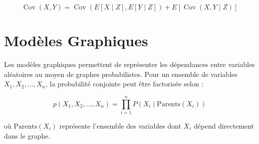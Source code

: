 \documentclass{article}
\begin{document}
\[
\operatorname{Cov}(X, Y) = \operatorname{Cov}\left( E[X \mid Z], E[Y \mid Z] \right) + E\left[ \operatorname{Cov}(X, Y \mid Z) \right]
\]

\section{Modèles Graphiques}

Les modèles graphiques permettent de représenter les dépendances entre variables aléatoires au moyen de graphes probabilistes. Pour un ensemble de variables $X_1, X_2, \dotsc, X_n$, la probabilité conjointe peut être factorisée selon :

\[
p(X_1, X_2, \dotsc, X_n) = \prod_{i=1}^n P\left( X_i \mid \text{Parents}(X_i) \right)
\]

où $\text{Parents}(X_i)$ représente l'ensemble des variables dont $X_i$ dépend directement dans le graphe.
\end{document}
